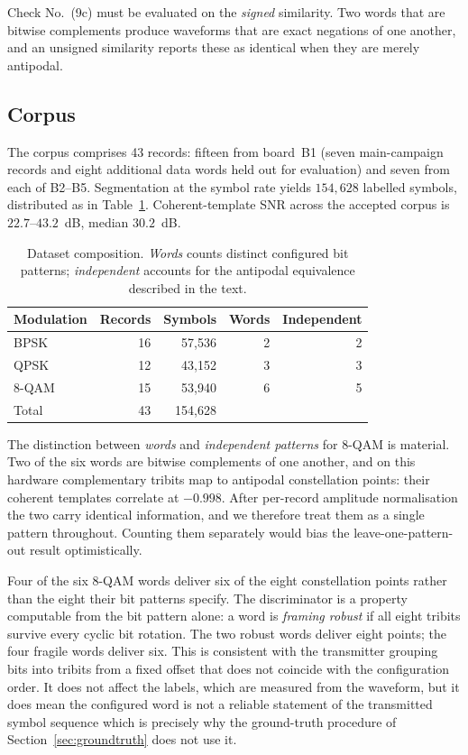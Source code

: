 \documentclass[journal]{IEEEtran}   %
\begin{document}
Check No.~(9c) must be evaluated on the \emph{signed} similarity. Two words that are
bitwise complements produce waveforms that are exact negations of one another,
and an unsigned similarity reports these as identical when they are merely
antipodal.

\subsection{Corpus}
The corpus comprises 43 records: fifteen from board~B1 (seven main-campaign
records and eight additional data words held out for evaluation) and seven from
each of B2--B5. Segmentation at the symbol rate yields $154{,}628$ labelled
symbols, distributed as in Table~\ref{tab:dataset}. Coherent-template SNR across
the accepted corpus is $22.7$--$43.2$~dB, median $30.2$~dB.

\begin{table}[!t]
\caption{Dataset composition. \emph{Words} counts distinct configured bit
patterns; \emph{independent} accounts for the antipodal equivalence described in the text.
}
\label{tab:dataset}
\centering
\begin{tabular}{lrrrr}
\toprule
Modulation & Records & Symbols & Words & Independent \\
\midrule
BPSK  & 16 & 57{,}536 & 2 & 2 \\
QPSK  & 12 & 43{,}152 & 3 & 3 \\
8-QAM & 15 & 53{,}940 & 6 & 5 \\
\midrule
Total & 43 & 154{,}628 & & \\
\bottomrule
\end{tabular}
\end{table}

The distinction between \emph{words} and \emph{independent patterns} for 8-QAM is
material. Two of the six words are bitwise complements of one another, and on
this hardware complementary tribits map to antipodal constellation points: their
coherent templates correlate at $-0.998$. After per-record amplitude
normalisation the two carry identical information, and we therefore treat them
as a single pattern throughout. Counting them separately would bias the
leave-one-pattern-out result optimistically.

Four of the six 8-QAM words deliver six of the eight constellation points rather
than the eight their bit patterns specify. The discriminator is a property
computable from the bit pattern alone: a word is \emph{framing robust} if all
eight tribits survive every cyclic bit rotation. The two robust words deliver
eight points; the four fragile words deliver six. This is consistent with the
transmitter grouping bits into tribits from a fixed offset that does not
coincide with the configuration order. It does not affect the labels, which are
measured from the waveform, but it does mean the configured word is not a
reliable statement of the transmitted symbol sequence which is precisely why
the ground-truth procedure of Section~\ref{sec:groundtruth} does not use it.
\end{document}
